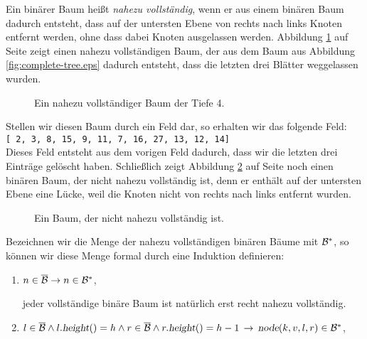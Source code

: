 \begin{enumerate}
      Ein bin\"arer Baum hei{\ss}t \emph{nahezu vollst\"andig}, wenn er aus einem bin\"aren Baum
      dadurch entsteht, dass auf der untersten Ebene von rechts nach links Knoten entfernt
      werden, ohne dass dabei Knoten ausgelassen werden.  Abbildung
      \ref{fig:nearly-complete-tree.eps} auf Seite \pageref{fig:nearly-complete-tree.eps}
      zeigt einen nahezu vollst\"andigen Baum, der aus dem Baum aus Abbildung
      \ref{fig:complete-tree.eps} dadurch entsteht, dass die letzten drei Bl\"atter
      weggelassen wurden.

      \begin{figure}[!ht]
        \centering
        \caption{Ein nahezu vollst\"andiger Baum der Tiefe 4.}
        \label{fig:nearly-complete-tree.eps}
      \end{figure}
      
      Stellen wir diesen Baum durch ein Feld dar, so erhalten wir das folgende Feld:
      \\[0.2cm]
      \hspace*{1.3cm}
      \texttt{[ 2, 3, 8, 15, 9, 11, 7, 16, 27, 13, 12, 14]} 
      \\[0.2cm]
      Dieses Feld entsteht aus dem vorigen Feld dadurch, dass wir die letzten drei
      Eintr\"age gel\"oscht haben.  Schlie{\ss}lich zeigt Abbildung
      \ref{fig:not-nearly-complete-tree.eps} auf Seite
      \pageref{fig:not-nearly-complete-tree.eps} noch einen bin\"aren Baum, der nicht nahezu
      vollst\"andig ist, denn er enth\"alt auf der untersten Ebene eine L\"ucke, weil die Knoten
      nicht von rechts nach links entfernt wurden.

      \begin{figure}[!ht]
        \centering
        \caption{Ein Baum, der nicht nahezu vollst\"andig ist.}
        \label{fig:not-nearly-complete-tree.eps}
      \end{figure}

      Bezeichnen wir die Menge der nahezu vollst\"andigen bin\"aren B\"aume mit $\mathcal{B}^*$, so
      k\"onnen wir diese Menge formal durch eine Induktion definieren:
      \begin{enumerate}
      \item $n \in \overline{\mathcal{B}} \rightarrow n \in \mathcal{B}^*$,

            jeder vollst\"andige bin\"are Baum ist nat\"urlich erst recht nahezu vollst\"andig.
      \item $l \in \overline{\mathcal{B}} \wedge l.\textsl{height}() = h \wedge r \in \overline{\mathcal{B}}
             \wedge r.\textsl{height}() = h-1 \,\rightarrow\,
             \textsl{node}(k,v,l,r) \in \mathcal{B}^*$,


\end{enumerate}
\end{enumerate}
